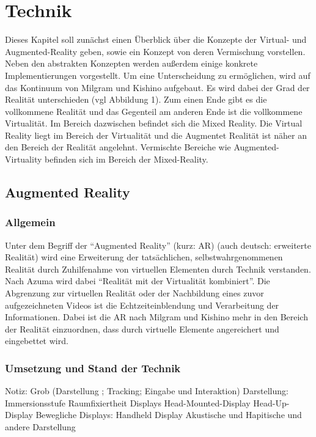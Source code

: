 \documentclass[12pt,a4paper,bibliography=totocnumbered,listof=totocnumbered]{scrartcl}
\begin{document}
\section{Technik}
Dieses Kapitel soll zunächst einen Überblick über die Konzepte der Virtual- und Augmented-Reality geben, sowie ein Konzept von deren Vermischung vorstellen. Neben den abstrakten Konzepten werden außerdem einige konkrete Implementierungen vorgestellt.  Um eine Unterscheidung zu ermöglichen, wird auf das Kontinuum von Milgram und Kishino aufgebaut. Es wird dabei der Grad der Realität unterschieden (vgl Abbildung 1). Zum einen Ende gibt es die vollkommene Realität und das Gegenteil am anderen Ende ist die vollkommene Virtualität. Im Bereich dazwischen befindet sich die Mixed Reality. Die Virtual Reality liegt im Bereich der Virtualität und die Augmentet Realität ist näher an den Bereich der Realität angelehnt. Vermischte Bereiche wie Augmented-Virtuality befinden sich im Bereich der Mixed-Reality.
\subsection{Augmented Reality}
\subsubsection{Allgemein}
Unter dem Begriff der “Augmented Reality” (kurz: AR) (auch deutsch: erweiterte Realität) wird eine Erweiterung der tatsächlichen, selbstwahrgenommenen Realität durch Zuhilfenahme von virtuellen Elementen durch Technik verstanden.
Nach Azuma wird dabei “Realität mit der Virtualität kombiniert”. Die Abgrenzung zur virtuellen Realität oder der Nachbildung eines zuvor aufgezeichneten Videos ist die Echtzeiteinblendung und Verarbeitung der Informationen. Dabei ist die AR nach Milgram und Kishino mehr in den Bereich der Realität einzuordnen, dass durch virtuelle Elemente angereichert und eingebettet wird.
\subsubsection{Umsetzung und Stand der Technik}
Notiz: Grob (Darstellung ; Tracking; Eingabe und Interaktion)
Darstellung:
Immersionsstufe
Raumfixiertheit
Displays
Head-Mounted-Display
Head-Up-Display
Bewegliche Displays: Handheld Display
Akustische und Hapitische und andere Darstellung
\end{document}
